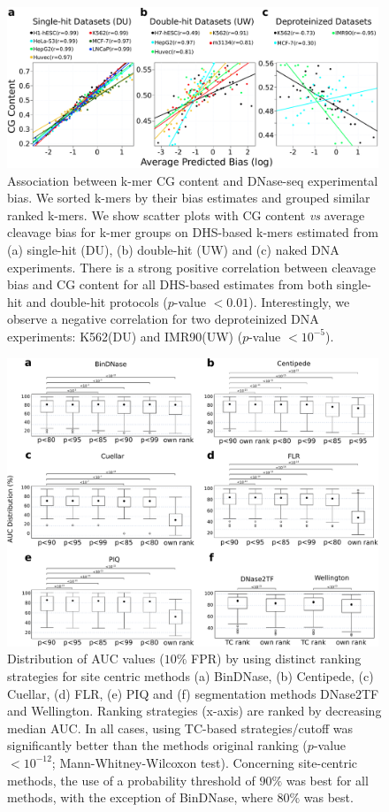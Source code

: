 \documentclass[11pt]{article}
\begin{document}
\clearpage

\begin{figure}[h!]
\centering
\includegraphics[width=0.99\textwidth]{Figs/Fig6.pdf}
\caption{Association between k-mer CG content and DNase-seq experimental bias. We sorted k-mers by their bias estimates and grouped similar ranked k-mers. We show scatter plots with CG content \textit{vs} average cleavage bias for k-mer groups on DHS-based k-mers estimated from (a) single-hit (DU), (b) double-hit (UW) and (c) naked DNA experiments. There is a strong positive correlation between cleavage bias and CG content for all DHS-based estimates from both single-hit and double-hit protocols ($p$-value $< 0.01$). Interestingly, we observe a negative correlation for two deproteinized DNA experiments: K562(DU) and IMR90(UW) ($p$-value $< 10^{-5}$).}
\label{fig:bias_cg}
\end{figure}

\clearpage

\begin{figure}[h!]
\centering
\includegraphics[width=0.99\textwidth]{Figs/Fig7.pdf}
\caption{Distribution of AUC values ($10\%$ FPR) by using distinct ranking strategies for site centric methods (a) BinDNase, (b) Centipede, (c) Cuellar, (d) FLR, (e) PIQ and (f) segmentation methods DNase2TF and Wellington. Ranking strategies (x-axis) are ranked by decreasing median AUC. In all cases, using TC-based strategies/cutoff was significantly better than the methods original ranking ($p$-value $< 10^{-12}$; Mann-Whitney-Wilcoxon test). Concerning site-centric methods, the use of a probability threshold of $90\%$ was best for all methods, with the exception of BinDNase, where $80\%$ was best.}
\label{fig:ranktest}
\end{figure}
\end{document}

